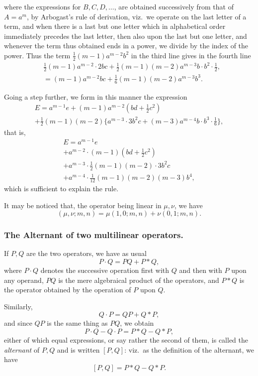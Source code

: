 \documentclass[11pt,a4paper]{article}
\theoremstyle{plain}
\begin{document}
where the expressions for $B, C, D, \ldots$, are obtained successively from that of $A = a^m$,
by Arbogast's rule of derivation, viz.\ we operate on the last letter of a term, and
when there is a last but one letter which in alphabetical order immediately precedes
the last letter, then also upon the last but one letter, and whenever the term thus
obtained ends in a power, we divide by the index of the power. Thus the term
$\frac{1}{2}(m-1)a^{m-2}b^2$ in the third line gives in the fourth line
\begin{align*}
&\tfrac{1}{2}(m-1)a^{m-2} \cdot 2bc + \tfrac{1}{2}(m-1)(m-2)a^{m-3}b \cdot b^2 \cdot \tfrac{1}{2}, \\
&= (m-1)a^{m-2}bc + \tfrac{1}{6}(m-1)(m-2)a^{m-3}b^3.
\end{align*}

\newpage
\noindent Going a step further, we form in this manner the expression
\begin{multline*}
E = a^{m-1}e + (m-1)a^{m-2}(bd + \tfrac{1}{2}c^2) \\
+ \tfrac{1}{2}(m-1)(m-2)\{a^{m-3} \cdot 3b^2c + (m-3)a^{m-4}b \cdot b^3 \cdot \tfrac{1}{6}\},
\end{multline*}
that is,
\begin{multline*}
E = a^{m-1}e \\
+ a^{m-2} \cdot (m-1)(bd + \tfrac{1}{2}c^2) \\
+ a^{m-3} \cdot \tfrac{1}{2}(m-1)(m-2) \cdot 3b^2c \\
+ a^{m-4} \cdot \tfrac{1}{12}(m-1)(m-2)(m-3)b^4,
\end{multline*}
which is sufficient to explain the rule.

It may be noticed that, the operator being linear in $\mu, \nu$, we have
\[
(\mu, \nu; m, n) = \mu(1, 0; m, n) + \nu(0, 1; m, n).
\]

\subsubsection*{The Alternant of two multilinear operators.}

If $P, Q$ are the two operators, we have as usual
\[
P \cdot Q = PQ + P * Q,
\]
where $P \cdot Q$ denotes the successive operation first with $Q$ and then with $P$ upon any
operand, $PQ$ is the mere algebraical product of the operators, and $P * Q$ is the operator
obtained by the operation of $P$ upon $Q$.

Similarly,
\[
Q \cdot P = QP + Q * P,
\]
and since $QP$ is the same thing as $PQ$, we obtain
\[
P \cdot Q - Q \cdot P = P * Q - Q * P,
\]
either of which equal expressions, or say rather the second of them, is called the
\textit{alternant} of $P, Q$ and is written $[P, Q]$: viz.\ as the definition of the alternant, we have
\[
[P, Q] = P * Q - Q * P.
\]
\end{document}
